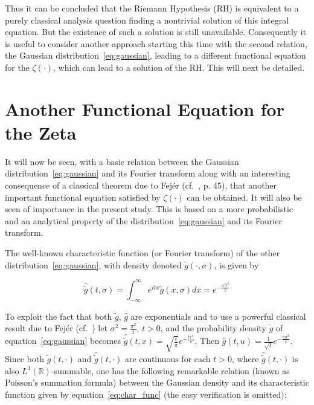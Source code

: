\documentclass[11pt]{article}
\begin{document}
Thus it can be concluded that the Riemann Hypothesis (RH) is equivalent to a purely classical analysis question finding a nontrivial solution of this integral equation. But the existence of such a solution is still unavailable. Consequently it is useful to consider another approach starting this time with the second relation, the Gaussian distribution~\eqref{eq:gaussian}, leading to a different functional equation for the $\zeta(\cdot)$, which can lead to a solution of the RH. This will next be detailed.

\section{Another Functional Equation for the Zeta}
\label{sec:functional}

It will now be seen, with a basic relation between the Gaussian distribution~\eqref{eq:gaussian} and its Fourier transform along with an interesting consequence of a classical theorem due to Fejér (cf.~\cite{zygmund}, p. 45), that another important functional equation satisfied by $\zeta(\cdot)$ can be obtained. It will also be seen of importance in the present study. This is based on a more probabilistic and an analytical property of the distribution~\eqref{eq:gaussian} and its Fourier transform.

The well-known characteristic function (or Fourier transform) of the other distribution~\eqref{eq:gaussian}, with density denoted $\tilde{g}(\cdot, \sigma)$, is given by

\begin{equation}
\label{eq:char_func}
\hat{\tilde{g}}(t, \sigma) = \int_{-\infty}^\infty e^{itx} \tilde{g}(x, \sigma) dx = e^{-\frac{\sigma^2 t^2}{2}}
\end{equation}

To exploit the fact that both $\tilde{g}$, $\hat{g}$ are exponentials and to use a powerful classical result due to Fejér (cf.~\cite{zygmund}) let $\sigma^2 = \frac{\pi^2}{t}$, $t > 0$, and the probability density $\tilde{g}$ of equation~\eqref{eq:gaussian} becomes $\hat{\tilde{g}}(t, x) = \sqrt{\frac{t}{\pi}} e^{-\frac{tx^2}{\pi}}$. Then $\hat{g}(t, u) = \frac{1}{\sqrt{t}} e^{-\frac{\pi u^2}{t}}$. Since both $\tilde{g}(t, \cdot)$ and $\hat{\tilde{g}}(t, \cdot)$ are continuous for each $t > 0$, where $\hat{\tilde{g}}(t, \cdot)$ is also $L^1(\mathbb{R})$-summable, one has the following remarkable relation (known as Poisson's summation formula) between the Gaussian density and its characteristic function given by equation~\eqref{eq:char_func} (the easy verification is omitted):
\end{document}
